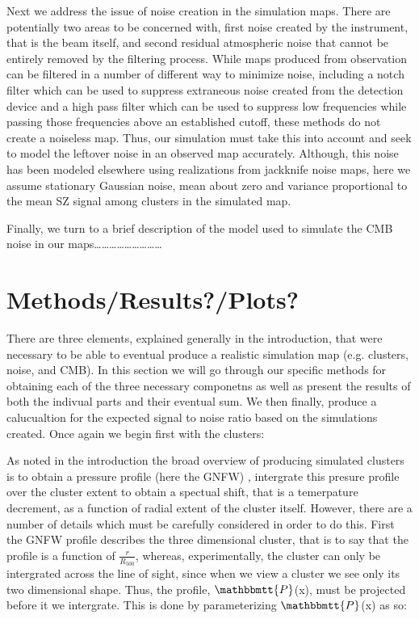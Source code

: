 \documentclass[12pt]{article} %
\begin{document}
Next we address the issue of noise creation in the simulation maps. There are potentially two areas to be concerned with, first noise created by the instrument, that is the beam itself, and second residual atmospheric noise that cannot be entirely removed by the filtering process. While maps produced from observation can be filtered in a number of different way to minimize noise, including a notch filter which can be used to suppress extraneous noise created from the detection device and a high pass filter which can be used to suppress low frequencies while passing those frequencies above an established cutoff, these methods do not create a noiseless map. Thus, our simulation must take this into account and seek to model the leftover noise in an observed map accurately. Although, this noise has been modeled elsewhere using realizations from jackknife noise maps, here we assume stationary Gaussian noise, mean about zero and variance proportional to the mean SZ signal among clusters in the simulated map.

Finally, we turn to a brief description of the model used to simulate the CMB noise in our maps………………………

\section{Methods/Results?/Plots?}

There are three elements, explained generally in the introduction, that were necessary to be able to eventual produce a realistic simulation map (e.g. clusters, noise, and CMB). In this section we will go through our specific methods for obtaining each of the three necessary componetns as well as present the results of both the indivual parts and their eventual sum. We then finally, produce a calucualtion for the expected signal to noise ratio based on the simulations created.  Once again we begin first with the clusters:

As noted in the introduction the broad overview of producing simulated clusters is to obtain a pressure profile (here the GNFW) , intergrate this presure profile over the cluster extent to obtain a spectual shift, that is a  temerpature decrement, as a function of radial extent of the cluster itself. However, there are a number of details which must be carefully considered in order to do this. First the GNFW profile describes the three dimensional cluster, that is to say that the profile is a function of $\frac{r}{R_{500}}$, whereas, experimentally, the cluster can only be intergrated across the line of sight, since when we view a cluster we see only its two dimensional shape. Thus, the profile,  $\mathbbmtt{P}$(x), must be projected before it we intergrate. This is done by parameterizing $\mathbbmtt{P}$(x) as so:
\end{document}
